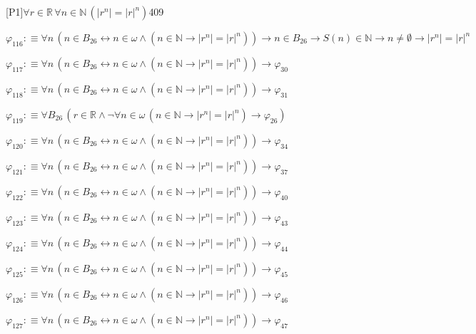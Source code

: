 \begin{fullproof}{[P1]}{$\forall r \in \mathbb{R}\,\forall n \in \mathbb{N}\,(\lvert {{r}^{n}} \rvert = {{\lvert r \rvert}^{n}})$}{409}
\begin{abbrevlist}
\item $\varphi_{116} :\equiv \forall n\,(n \in B_{26} \leftrightarrow n \in \omega \land (n \in \mathbb{N} \to \lvert {{r}^{n}} \rvert = {{\lvert r \rvert}^{n}})) \to n \in B_{26} \to S(n) \in \mathbb{N} \to n \neq \emptyset \to \lvert {{r}^{n}} \rvert = {{\lvert r \rvert}^{n}}$
\item $\varphi_{117} :\equiv \forall n\,(n \in B_{26} \leftrightarrow n \in \omega \land (n \in \mathbb{N} \to \lvert {{r}^{n}} \rvert = {{\lvert r \rvert}^{n}})) \to \varphi_{30}$
\item $\varphi_{118} :\equiv \forall n\,(n \in B_{26} \leftrightarrow n \in \omega \land (n \in \mathbb{N} \to \lvert {{r}^{n}} \rvert = {{\lvert r \rvert}^{n}})) \to \varphi_{31}$
\item $\varphi_{119} :\equiv \forall B_{26}\,(r \in \mathbb{R} \land \neg \forall n \in \omega\,(n \in \mathbb{N} \to \lvert {{r}^{n}} \rvert = {{\lvert r \rvert}^{n}}) \to \varphi_{26})$
\item $\varphi_{120} :\equiv \forall n\,(n \in B_{26} \leftrightarrow n \in \omega \land (n \in \mathbb{N} \to \lvert {{r}^{n}} \rvert = {{\lvert r \rvert}^{n}})) \to \varphi_{34}$
\item $\varphi_{121} :\equiv \forall n\,(n \in B_{26} \leftrightarrow n \in \omega \land (n \in \mathbb{N} \to \lvert {{r}^{n}} \rvert = {{\lvert r \rvert}^{n}})) \to \varphi_{37}$
\item $\varphi_{122} :\equiv \forall n\,(n \in B_{26} \leftrightarrow n \in \omega \land (n \in \mathbb{N} \to \lvert {{r}^{n}} \rvert = {{\lvert r \rvert}^{n}})) \to \varphi_{40}$
\item $\varphi_{123} :\equiv \forall n\,(n \in B_{26} \leftrightarrow n \in \omega \land (n \in \mathbb{N} \to \lvert {{r}^{n}} \rvert = {{\lvert r \rvert}^{n}})) \to \varphi_{43}$
\item $\varphi_{124} :\equiv \forall n\,(n \in B_{26} \leftrightarrow n \in \omega \land (n \in \mathbb{N} \to \lvert {{r}^{n}} \rvert = {{\lvert r \rvert}^{n}})) \to \varphi_{44}$
\item $\varphi_{125} :\equiv \forall n\,(n \in B_{26} \leftrightarrow n \in \omega \land (n \in \mathbb{N} \to \lvert {{r}^{n}} \rvert = {{\lvert r \rvert}^{n}})) \to \varphi_{45}$
\item $\varphi_{126} :\equiv \forall n\,(n \in B_{26} \leftrightarrow n \in \omega \land (n \in \mathbb{N} \to \lvert {{r}^{n}} \rvert = {{\lvert r \rvert}^{n}})) \to \varphi_{46}$
\item $\varphi_{127} :\equiv \forall n\,(n \in B_{26} \leftrightarrow n \in \omega \land (n \in \mathbb{N} \to \lvert {{r}^{n}} \rvert = {{\lvert r \rvert}^{n}})) \to \varphi_{47}$

\end{abbrevlist}
\end{fullproof}
